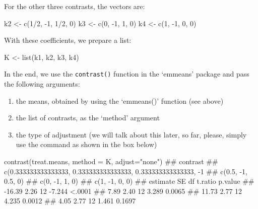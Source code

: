 \documentclass[a4paper,12pt,oneside]{book}
\providecommand{\tightlist}{%
  \setlength{\itemsep}{0pt}\setlength{\parskip}{0pt}}
\newenvironment{Shaded}{\begin{snugshade}}{\end{snugshade}}
\newcommand{\DecValTok}[1]{#1}
\newcommand{\SpecialCharTok}[1]{#1}
\newcommand{\StringTok}[1]{#1}
\newcommand{\DocumentationTok}[1]{#1}
\newcommand{\OtherTok}[1]{#1}
\newcommand{\FunctionTok}[1]{#1}
\newcommand{\AttributeTok}[1]{#1}
\newcommand{\NormalTok}[1]{#1}
\begin{document}
For the other three contrasts, the vectors are:

\begin{Shaded}
\begin{Highlighting}[]
\NormalTok{k2 }\OtherTok{\textless{}{-}} \FunctionTok{c}\NormalTok{(}\DecValTok{1}\SpecialCharTok{/}\DecValTok{2}\NormalTok{, }\SpecialCharTok{{-}}\DecValTok{1}\NormalTok{, }\DecValTok{1}\SpecialCharTok{/}\DecValTok{2}\NormalTok{, }\DecValTok{0}\NormalTok{)}
\NormalTok{k3 }\OtherTok{\textless{}{-}} \FunctionTok{c}\NormalTok{(}\DecValTok{0}\NormalTok{, }\SpecialCharTok{{-}}\DecValTok{1}\NormalTok{, }\DecValTok{1}\NormalTok{, }\DecValTok{0}\NormalTok{)}
\NormalTok{k4 }\OtherTok{\textless{}{-}} \FunctionTok{c}\NormalTok{(}\DecValTok{1}\NormalTok{, }\SpecialCharTok{{-}}\DecValTok{1}\NormalTok{, }\DecValTok{0}\NormalTok{, }\DecValTok{0}\NormalTok{)}
\end{Highlighting}
\end{Shaded}

With these coefficients, we prepare a list:

\begin{Shaded}
\begin{Highlighting}[]
\NormalTok{K }\OtherTok{\textless{}{-}} \FunctionTok{list}\NormalTok{(k1, k2, k3, k4)}
\end{Highlighting}
\end{Shaded}

In the end, we use the \texttt{contrast()} function in the `emmeans' package and pass the following arguments:

\begin{enumerate}
\def\labelenumi{\arabic{enumi}.}
\tightlist
\item
  the means, obtained by using the `emmeans()' function (see above)
\item
  the list of contrasts, as the `method' argument
\item
  the type of adjustment (we will talk about this later, so far, please, simply use the command as shown in the box below)
\end{enumerate}

\small

\begin{Shaded}
\begin{Highlighting}[]
\FunctionTok{contrast}\NormalTok{(treat.means, }\AttributeTok{method =}\NormalTok{ K, }\AttributeTok{adjust=}\StringTok{"none"}\NormalTok{)}
\DocumentationTok{\#\#  contrast                                                     }
\DocumentationTok{\#\#  c(0.333333333333333, 0.333333333333333, 0.333333333333333, {-}1}
\DocumentationTok{\#\#  c(0.5, {-}1, 0.5, 0)                                           }
\DocumentationTok{\#\#  c(0, {-}1, 1, 0)                                               }
\DocumentationTok{\#\#  c(1, {-}1, 0, 0)                                               }
\DocumentationTok{\#\#  estimate   SE df t.ratio p.value}
\DocumentationTok{\#\#    {-}16.39 2.26 12 {-}7.244  \textless{}.0001 }
\DocumentationTok{\#\#      7.89 2.40 12  3.289  0.0065 }
\DocumentationTok{\#\#     11.73 2.77 12  4.235  0.0012 }
\DocumentationTok{\#\#      4.05 2.77 12  1.461  0.1697}
\end{Highlighting}
\end{Shaded}
\end{document}
